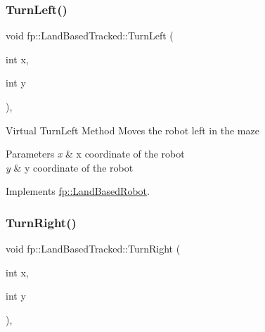 \mbox{\label{classfp_1_1_land_based_tracked_a2b106dbbb108cb97f212ed661e8d244b}} 
\subsubsection{\texorpdfstring{Turn\+Left()}{TurnLeft()}}
{\footnotesize\ttfamily void fp\+::\+Land\+Based\+Tracked\+::\+Turn\+Left (\begin{DoxyParamCaption}\item[{int}]{x,  }\item[{int}]{y }\end{DoxyParamCaption})\hspace{0.3cm}{\ttfamily [override]}, {\ttfamily [virtual]}}

Virtual Turn\+Left Method Moves the robot left in the maze 
\begin{DoxyParams}{Parameters}
{\em x} & x coordinate of the robot \\
\hline
{\em y} & y coordinate of the robot \\
\hline
\end{DoxyParams}


Implements \hyperlink{classfp_1_1_land_based_robot_a359e1012e9093475b7a1b0d38e41a118}{fp\+::\+Land\+Based\+Robot}.

\mbox{\label{classfp_1_1_land_based_tracked_a00cc1731e59096f3fe490f108ebc7012}} 
\subsubsection{\texorpdfstring{Turn\+Right()}{TurnRight()}}
{\footnotesize\ttfamily void fp\+::\+Land\+Based\+Tracked\+::\+Turn\+Right (\begin{DoxyParamCaption}\item[{int}]{x,  }\item[{int}]{y }\end{DoxyParamCaption})\hspace{0.3cm}{\ttfamily [override]}, {\ttfamily [virtual]}}

